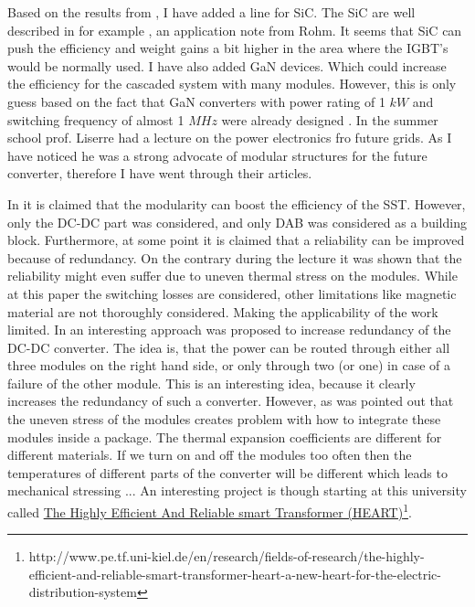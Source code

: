 \documentclass[]{scrartcl}
\begin{document}
%
Based on the results from \cite{Yang2014}, I have added a line for SiC.  The SiC are well described in for example \cite{Rohm2014}, an application note from Rohm. It seems that SiC can push the efficiency and weight gains a bit higher in the area where the IGBT's would be normally used. I have also added GaN devices. Which could increase the efficiency for the cascaded system with many modules. However, this is only guess based on the fact that GaN converters with power rating of 1 $kW$ and switching frequency of almost 1 $MHz$ were already designed \cite{Mu2014}. 
%
In the summer school prof. Liserre had a lecture on the power electronics fro future grids. As I have noticed he was a strong advocate of modular structures for the future converter, therefore I have went through their articles. 



%
In \cite{Quartarone} it is claimed that the modularity can boost the efficiency of the SST. However, only the DC-DC part was considered, and only DAB was considered as a building block.  Furthermore, at some point it is claimed that a reliability can be improved because of redundancy. On the contrary during the lecture it was shown that the reliability might even suffer due to uneven thermal stress on the modules. While at this paper the switching losses are considered, other limitations like magnetic material are not thoroughly considered. Making the applicability of the work limited. 
%
In \cite{Costa2015} an interesting approach was proposed to increase redundancy of the DC-DC converter. 
%
The idea is, that the power can be routed through either all three modules on the right hand side, or only through two (or one) in case of a failure of  the other module. This is an interesting idea, because it clearly increases the redundancy of such a converter. However, as was pointed out that the uneven stress of the modules creates problem with how to integrate these modules inside a package. The thermal expansion coefficients are different for different materials. If we  turn on and off the modules too often then the temperatures of different parts of the converter will be different which leads to mechanical stressing ... An interesting project is though starting at this university called \href{<http://www.pe.tf.uni-kiel.de/en/research/fields-of-research/the-highly-efficient-and-reliable-smart-transformer-heart-a-new-heart-for-the-electric-distribution-system>}{The Highly Efficient And Reliable smart Transformer (HEART)}\footnote{http://www.pe.tf.uni-kiel.de/en/research/fields-of-research/the-highly-efficient-and-reliable-smart-transformer-heart-a-new-heart-for-the-electric-distribution-system}.
\end{document}
